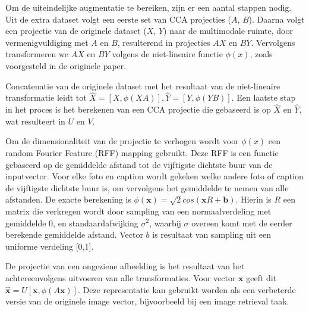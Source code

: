 Om de uiteindelijke augmentatie te bereiken, zijn er een aantal stappen nodig. Uit de extra dataset volgt een eerste set van CCA projecties ($A$, $B$). Daarna volgt een projectie van de originele dataset ($X$, $Y$) naar de multimodale ruimte, door vermenigvuldiging met $A$ en $B$, resulterend in projecties $AX$ en $BY$. Vervolgens transformeren we $AX$ en $BY$ volgens de niet-lineaire functie $\phi(x)$, zoals voorgesteld in de originele paper.

Concatenatie van de originele dataset met het resultaat van de niet-lineaire transformatie leidt tot $\hat{X} = [X, \phi(XA)], \hat{Y} = [Y, \phi(YB)]$. Een laatste stap in het proces is het berekenen van een CCA projectie die gebaseerd is op $\hat{X}$ en $\hat{Y}$, wat resulteert in $U$ en $V$.

Om de dimensionaliteit van de projectie te verhogen wordt voor $\phi(x)$ een random Fourier Feature (RFF) mapping gebruikt. Deze RFF is een functie gebaseerd op de gemiddelde afstand tot de vijftigste dichtste buur van de inputvector. Voor elke foto en caption wordt gekeken welke andere foto of caption de vijftigste dichtste buur is, om vervolgens het gemiddelde te nemen van alle afstanden. De exacte berekening is $\phi(\mathbf{x})=\sqrt{2}cos(\mathbf{x}R+\mathbf{b})$. Hierin is $R$ een matrix die verkregen wordt door sampling van een normaalverdeling met gemiddelde 0, en standaardafwijking $\sigma^2$, waarbij $\sigma$ overeen komt met de eerder berekende gemiddelde afstand. Vector $b$ is resultaat van sampling uit een uniforme verdeling [0,1].

De projectie van een ongeziene afbeelding is het resultaat van het achtereenvolgens uitvoeren van alle transformaties. Voor vector $\mathbf{x}$ geeft dit $\mathbf{\hat{x}} = U[\mathbf{x}, \phi(A\mathbf{x})]$. Deze representatie kan gebruikt worden als een verbeterde versie van de originele image vector, bijvoorbeeld bij een image retrieval taak.
